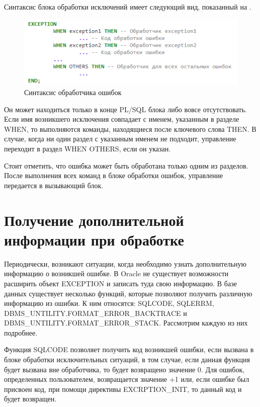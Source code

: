 Синтаксис блока обработки исключений имеет следующий вид, показанный на .

\begin{figure}[ht!] 
	\center
	\includegraphics [scale=1] {my_folder/img/C1_exeception_handling_syntax}
	\caption{Синтаксис обработчика ошибок} 
	\label{fig:C1_exeception_handling_syntax}  
\end{figure}
\FloatBarrier

Он может находиться только в конце PL/SQL блока либо вовсе отсутствовать. Если имя возникшего исключения совпадает с именем, указанным в разделе WHEN, то выполняются команды, находящиеся после ключевого слова THEN. В случае, когда ни один раздел с указанным именем не подходит, управление переходит в раздел WHEN OTHERS, если он указан. 

Стоит отметить, что ошибка может быть обработана только одним из разделов. После выполнения всех команд в блоке обработки ошибок, управление передается в вызывающий блок. 


\section{Получение дополнительной информации при обработке}\label{ch1:sec5}
Периодически, возникают ситуации, когда необходимо узнать дополнительную информацию о возникшей ошибке. В Oracle не существует возможности расширить объект EXCEPTION и записать туда свою информацию. В базе данных существует несколько функций, которые позволяют получить различную информацию из ошибки. К ним относятся: SQLCODE, SQLERRM, DBMS\_UNTILITY.FORMAT\_ERROR\_BACKTRACE и DBMS\_UNTILITY.FORMAT\_ERROR\_STACK. 
Рассмотрим каждую из них подробнее. 

Функция SQLCODE позволяет получить код возникшей ошибки, если вызвана в блоке обработки исключительных ситуаций, в том случае, если данная функция будет вызвана вне обработчика, то будет возвращено значение 0. Для ошибок, определенных пользователем, возвращается значение +1 или, если ошибке был присвоен код, при помощи директивы EXCRPTION\_INIT, то данный код и будет возвращен. 

